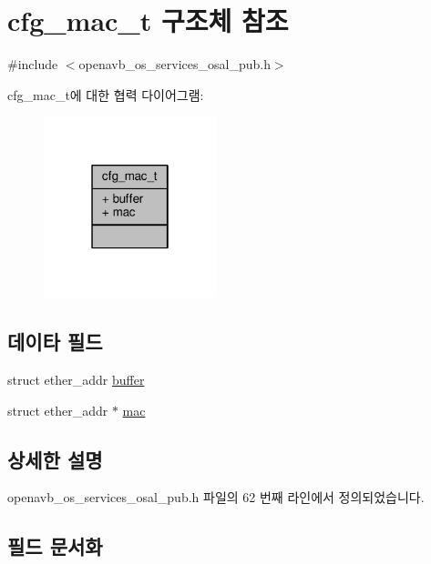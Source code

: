 \hypertarget{structcfg__mac__t}{}\section{cfg\+\_\+mac\+\_\+t 구조체 참조}
\label{structcfg__mac__t}


{\ttfamily \#include $<$openavb\+\_\+os\+\_\+services\+\_\+osal\+\_\+pub.\+h$>$}



cfg\+\_\+mac\+\_\+t에 대한 협력 다이어그램\+:
\nopagebreak
\begin{figure}[H]
\begin{center}
\leavevmode
\includegraphics[width=142pt]{structcfg__mac__t__coll__graph}
\end{center}
\end{figure}
\subsection*{데이타 필드}
\begin{DoxyCompactItemize}
\item 
struct ether\+\_\+addr \hyperlink{structcfg__mac__t_ab04370ca333258063d83080192e0265d}{buffer}
\item 
struct ether\+\_\+addr $\ast$ \hyperlink{structcfg__mac__t_af2bc5d41ceefb37a387542f87c90ccb8}{mac}
\end{DoxyCompactItemize}


\subsection{상세한 설명}


openavb\+\_\+os\+\_\+services\+\_\+osal\+\_\+pub.\+h 파일의 62 번째 라인에서 정의되었습니다.



\subsection{필드 문서화}
